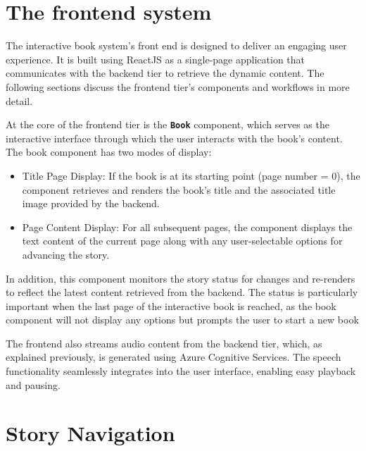 \documentclass[conference]{IEEEtran}
\begin{document}
	
	\section{The frontend system}
	
	The interactive book system's front end is designed to deliver an engaging user experience. It is built using ReactJS as a single-page application that communicates with the backend tier to retrieve the dynamic content. The following sections discuss the frontend tier's components and workflows in more detail.
	
	At the core of the frontend tier is the \textbf{\texttt{Book}} component, which serves as the interactive interface through which the user interacts with the book's content. The book component has two modes of display:
	
	\begin{itemize}
		\item Title Page Display: If the book is at its starting point (page number = 0), the component retrieves and renders the book's title and the associated title image provided by the backend.
		\item Page Content Display: For all subsequent pages, the component displays the text content of the current page along with any user-selectable options for advancing the story.
	\end{itemize}
	
	In addition, this component monitors the story status for changes and re-renders to reflect the latest content retrieved from the backend. The status is particularly important when the last page of the interactive book is reached, as the book component will not display any options but prompts the user to start a new book
	
	The frontend also streams audio content from the backend tier, which, as explained previously, is generated using Azure Cognitive Services. The speech functionality seamlessly integrates into the user interface, enabling easy playback and pausing.	
		
	
\printbibliography
\onecolumn
\pagebreak

\appendices

\section{Story Navigation}
\label{appendix:navigation}
	
\end{document}

